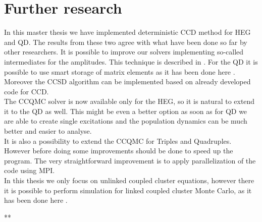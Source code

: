 \documentclass[twoside,english]{uiofysmaster}
\theoremstyle{definition}
\begin{document}
\chapter{Further research}
In this master thesis we have implemented deterministic CCD method for HEG and QD. The results from these two agree with what have been done so far by other researchers. It is possible to improve our solvers implementing so-called intermediates for the amplitudes. This technique is described in \cite{hjorth-jensenAdvancedCourseComputational2017}.  For the QD it is possible to use smart storage of matrix elements as it has been done here \cite{leikangerFullConfigurationInteraction}. Moreover the CCSD algorithm can be implemented based on already developed code for CCD. \\
The CCQMC solver is now available only for the HEG, so it is natural to extend it to the QD as well. This might be even a better option as soon as for QD we are able to create single excitations and the population dynamics can be much better and easier to analyse.\\
It is also a possibility to extend the CCQMC for Triples and Quadruples. However before doing some improvements should be done to speed up the program. The very straightforward improvement is to apply parallelization of the code using MPI. \\
In this thesis we only focus on unlinked coupled cluster equations, however there it is possible to perform simulation for linked coupled cluster Monte Carlo, as it has been done here \cite{franklinLinkedCoupledCluster2016}.



\clearpage
\newpage
**\appendix
\end{document}
